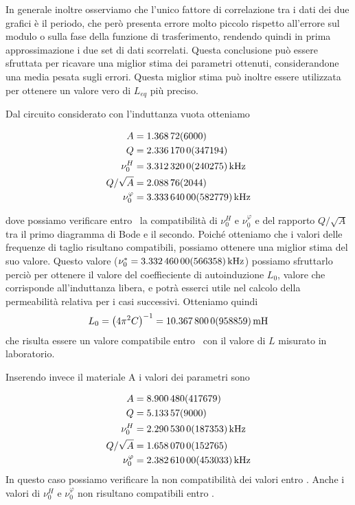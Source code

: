 \documentclass[
    prl,
    floatfix,
    reprint, 
    superscriptaddress, 
    altaffilletter, 
    amsmath, 
    amssymb, 
    a4paper]{revtex4-2}
\begin{document}
In generale inoltre osserviamo che l'unico fattore di correlazione tra i dati dei due grafici è il periodo, che però presenta errore molto piccolo rispetto all'errore sul modulo o sulla fase della funzione di trasferimento, rendendo quindi in prima approssimazione i due set di dati scorrelati. Questa conclusione può essere sfruttata per ricavare una miglior stima dei parametri ottenuti, considerandone una media pesata sugli errori. Questa miglior stima può inoltre essere utilizzata per ottenere un valore vero di $L_{eq}$ più preciso.

Dal circuito considerato con l'induttanza vuota otteniamo 

\begin{align*}
    A     &= \num{1.36872 +- 0.06}\\
    Q     &= \num{2.33617 +- 0.0347194}\\
    \nu_0^H &= \SI{3.31232 +- 0.0240275}{\kilo\hertz}\\
    Q / \sqrt{A} &= \num{2.08876 +- 0.02044}\\
    \nu_0^\varphi &= \SI[]{3.33364 +- 0.00582779}[]{\kilo\hertz}
\end{align*}

dove possiamo verificare entro \treSigma\ la compatibilità di $\nu_0^H$ e $\nu_0^\varphi$ e del rapporto $Q / \sqrt{A}$ tra il primo diagramma di Bode e il secondo.
Poiché otteniamo che i valori delle frequenze di taglio risultano compatibili, possiamo ottenere una miglior stima del suo valore. Questo valore ($\nu_0^{*}=\SI{3.33246 +- 0.00566358}{\kilo\hertz}$) possiamo sfruttarlo perciò per ottenere il valore del coeffieciente di autoinduzione $L_0$, valore che corrisponde all'induttanza libera, e potrà esserci utile nel calcolo della permeabilità relativa per i casi successivi.
Otteniamo quindi \[L_0 = \left(4\pi^2C\right)^{-1} = \SI{10.3678 +- 0.0958859}{\milli\henry}\]che risulta essere un valore compatibile entro \treSigma\ con il valore di $L$ misurato in laboratorio.

Inserendo invece il materiale A i valori dei parametri sono

\begin{align*}
    A     &= \num{8.90048 +- 0.417679}\\
    Q     &= \num{5.13357 +- 0.09}\\
    \nu_0^H &= \SI{2.29053 +- 0.0187353}{\kilo\hertz}\\
    Q / \sqrt{A} &= \num{1.65807 +- 0.0152765}\\
    \nu_0^\varphi &= \SI[]{2.38261 +- 0.00453033}[]{\kilo\hertz} 
\end{align*}
In questo caso possiamo verificare la non compatibilità dei valori entro \treSigma. Anche i valori di $\nu_0^H$ e $\nu_0^\varphi$ non risultano compatibili entro \treSigma. 
\end{document}
